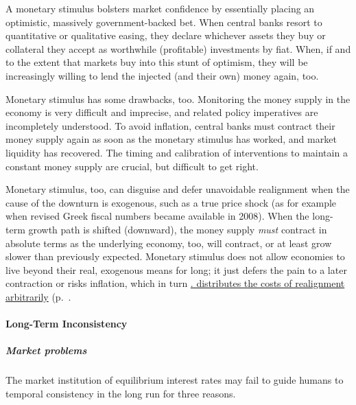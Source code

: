 A monetary stimulus bolsters market confidence by essentially placing an optimistic, massively government-backed bet. When central banks resort to quantitative or qualitative easing, they declare whichever assets they buy or collateral they accept as worthwhile (profitable) investments by fiat. When, if and to the extent that markets buy into this stunt of optimism, they will be increasingly willing to lend the injected (and their own) money again, too.

Monetary stimulus has some drawbacks, too. Monitoring the money supply in the economy is very difficult and imprecise, and related policy imperatives are incompletely understood. To avoid inflation, central banks must contract their money supply again as soon as the monetary stimulus has worked, and market liquidity has recovered. The timing and calibration of interventions to maintain a constant money supply are crucial, but difficult to get right. 

Monetary stimulus, too, can disguise and defer unavoidable realignment when the cause of the downturn is exogenous, such as a true price shock (as for example when revised Greek fiscal numbers became available in 2008). When the long-term growth path is shifted (downward), the money supply \emph{must} contract in absolute terms as the underlying economy, too, will contract, or at least grow slower than previously expected. Monetary stimulus does not allow economies to live beyond their real, exogenous means for long; it just defers the pain to a later contraction or risks inflation, which in turn \hyperref[sec:distributive-effects-of-inflation]{. distributes the costs of realignment arbitrarily} (p.~\pageref{sec:distributive-effects-of-inflation}. 


\paragraph{Long-Term Inconsistency} \label{sec:long-terminconsistency}

\subparagraph{Market problems} The market institution of equilibrium interest rates may fail to guide humans to temporal consistency in the long run for three reasons.

